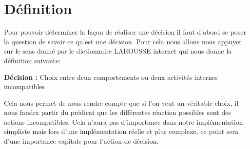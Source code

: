 \section{Définition}

Pour pouvoir déterminer la façon de réaliser une décision il faut d'abord se
poser la question de savoir ce qu'est une décision. Pour cela nous allons nous
appuyer sur le sens donné par le dictionnaire LAROUSSE internet qui nous donne
la définition suivante:

\begin{center}
  {\bfseries Décision :} Choix entre deux comportements ou deux activités
  internes incompatibles
\end{center}

Cela nous permet de nous rendre compte que si l'on veut un véritable choix, il
nous faudra partir du prédicat que les différentes réaction possibles sont des
actions incompatibles. Cela n'aura pas d'importance dans notre implémentation
simpliste mais lors d'une implémentation réelle et plus complexe, ce point sera
d'une importance capitale pour l'action de décision.
